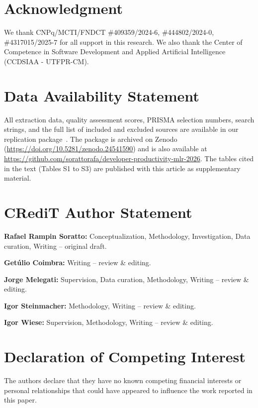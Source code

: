 \documentclass[preprint,number]{elsarticle}
\begin{document}
\section*{Acknowledgment}

We thank CNPq/MCTI/FNDCT \#409359/2024-6, \#444802/2024-0, \#4317015/2025-7 for all support in this research. We also thank the Center of Competence in Software Development and Applied Artificial Intelligence (CCDSIAA - UTFPR-CM).

\section*{Data Availability Statement}

All extraction data, quality assessment scores, PRISMA selection numbers, search strings, and the full list of included and excluded sources are available in our replication package~\cite{replication2026}.
The package is archived on Zenodo (\url{https://doi.org/10.5281/zenodo.24541590}) and is also available at \url{https://github.com/sorattorafa/developer-productivity-mlr-2026}. The tables cited in the text (Tables S1 to S3) are published with this article as supplementary material.

\section*{CRediT Author Statement}

\textbf{Rafael Rampin Soratto:} Conceptualization, Methodology, Investigation, Data curation, Writing -- original draft.

\textbf{Getúlio Coimbra:} Writing -- review \& editing.

\textbf{Jorge Melegati:} Supervision, Data curation, Methodology, Writing -- review \& editing.

\textbf{Igor Steinmacher:} Methodology, Writing -- review \& editing.

\textbf{Igor Wiese:} Supervision, Methodology, Writing -- review \& editing.
\section*{Declaration of Competing Interest}

The authors declare that they have no known competing financial interests or personal relationships that could have appeared to influence the work reported in this paper.

\FloatBarrier %



\end{document}
